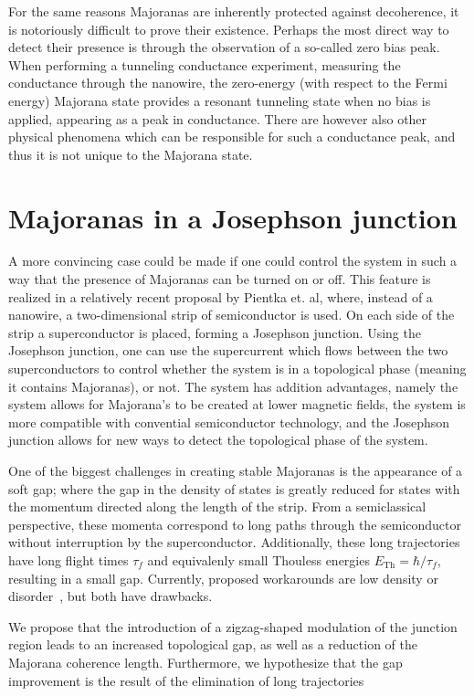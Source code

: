 	For the same reasons Majoranas are inherently protected against decoherence, it is notoriously difficult to prove their existence.
	Perhaps the most direct way to detect their presence is through the observation of a so-called zero bias peak.
	When performing a tunneling conductance experiment, measuring the conductance through the nanowire, the zero-energy (with respect to the Fermi energy) Majorana state provides a resonant tunneling state when no bias is applied, appearing as a peak in conductance.
	There are however also other physical phenomena which can be responsible for such a conductance peak, and thus it is not unique to the Majorana state.

\section{Majoranas in a Josephson junction}
	A more convincing case could be made if one could control the system in such a way that the presence of Majoranas can be turned on or off.
	This feature is realized in a relatively recent proposal by Pientka et. al\cite{pientka_topological_2017}, where, instead of a nanowire, a two-dimensional strip of semiconductor is used.
	On each side of the strip a superconductor is placed, forming a Josephson junction.
	Using the Josephson junction, one can use the supercurrent which flows between the two superconductors to control whether the system is in a topological phase (meaning it contains Majoranas), or not.
	The system has addition advantages, namely the system allows for Majorana's to be created at lower magnetic fields, the system is more compatible with convential semiconductor technology, and the Josephson junction allows for new ways to detect the topological phase of the system.


	One of the biggest challenges in creating stable Majoranas is the appearance of a soft gap; where the gap in the density of states is greatly reduced for states with the momentum directed along the length of the strip.
	From a semiclassical perspective, these momenta correspond to long paths through the semiconductor without interruption by the superconductor.
	Additionally, these long trajectories have long flight times $\tau_f$ and equivalenly small Thouless energies $E_{\textrm{Th}}=\hbar / \tau_f$, resulting in a small gap. 
	Currently, proposed workarounds are low density or disorder~\cite{haim_double-edge_2018}, but both have drawbacks.


	We propose that the introduction of a zigzag-shaped modulation of the junction region leads to an increased topological gap, as well as a reduction of the Majorana coherence length.
	Furthermore, we hypothesize that the gap improvement is the result of the elimination of long trajectories